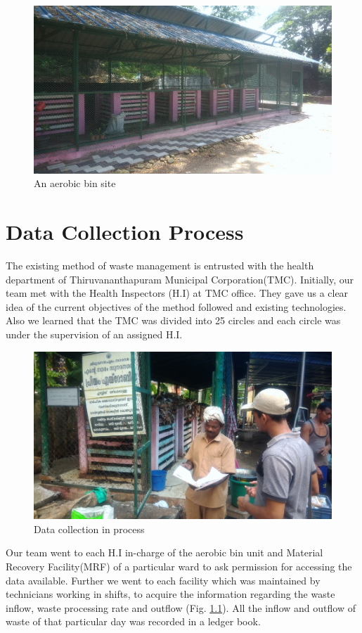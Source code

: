 \documentclass[12pt,a4paper]{report}
\begin{document}
\begin{figure}[H]
	\centering
	\includegraphics[width=0.75\linewidth]{aerobins}
	\caption{An aerobic bin site}
	\label{fig:aerobins}
\end{figure}

\chapter{\textbf{Data Collection Process}}
The existing method of waste management is entrusted with the health department of Thiruvananthapuram Municipal Corporation(TMC). Initially, our team met with the Health Inspectors (H.I) at TMC office. They gave us a clear idea of the current objectives of the method followed and existing technologies. Also we learned that the TMC was divided into 25 circles and each circle was under the supervision of an assigned H.I.

\begin{figure}[H]
	\centering
	\includegraphics[width=0.7\linewidth]{data_collect}
	\caption{Data collection in process}
	\label{fig:datacollect}
\end{figure}

Our team went to each H.I in-charge of the aerobic bin unit and Material Recovery Facility(MRF) of a particular ward to ask permission for accessing the data available. Further we went to each facility which was maintained by technicians working in shifts, to acquire the information regarding the waste inflow, waste processing rate and outflow (Fig. \ref{fig:datacollect}). All the inflow and outflow of waste of that particular day was recorded in a ledger book. 
\end{document}
